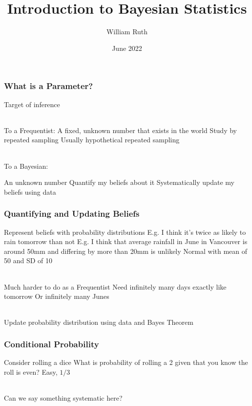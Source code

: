 \documentclass{beamer}
\title{Introduction to Bayesian Statistics}
\author{William Ruth}
\date{June 2022}
\begin{document}
\frame{\titlepage}

\begin{frame}
\frametitle{What is a Parameter?}\pause

\begin{outline}
\1<+-> Target of inference  \\~\ 

\1<+-> To a Frequentist:
    \2<+-> A fixed, unknown number that exists in the world
    \2<+-> Study by repeated sampling
        \3<+-> Usually hypothetical repeated sampling\\~\ 

\1<+-> To a Bayesian:

    \2<+-> An unknown number
    \2<+-> Quantify my beliefs about it
    \2<+-> Systematically update my beliefs using data
\end{outline}
\end{frame}

\begin{frame}
\frametitle{Quantifying and Updating Beliefs}\pause

\begin{outline}
\1<+-> Represent beliefs with probability distributions
    \2<+-> E.g. I think it's twice as likely to rain tomorrow than not
    \2<+-> E.g. I think that average rainfall in June in Vancouver is around 50mm and differing by more than 20mm is unlikely
    \3<+-> Normal with mean of 50 and SD of 10 \\~\

\1<+-> Much harder to do as a Frequentist
    \2<+-> Need infinitely many days exactly like tomorrow
    \2<+-> Or infinitely many Junes \\~\

\1<+-> Update probability distribution using data and Bayes Theorem
\end{outline}

\end{frame}

\begin{frame}
    \frametitle{Conditional Probability}\pause

    \begin{outline}
        \1<+-> Consider rolling a dice
        \1<+-> What is probability of rolling a 2 given that you know the roll is even?
            \2<+-> Easy, $1/3$ \\~\

        \1<+-> Can we say something systematic here?
    \end{outline}

\end{frame}
\end{document}
